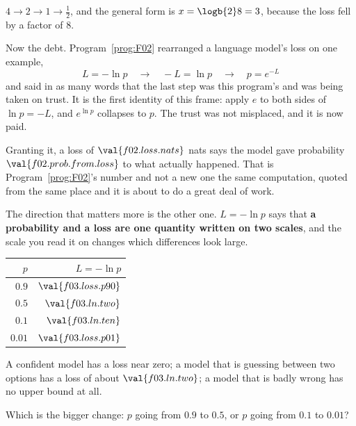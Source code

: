 \begin{fr}
$4 \to 2 \to 1 \to \tfrac{1}{2}$, and the general form is
$x = \logb{2} 8 = 3$, because the loss fell by a factor of $8$.

Now the debt. Program~\ref{prog:F02} rearranged a language model's loss on one
example,
\[ L = -\ln p \quad\longrightarrow\quad -L = \ln p
   \quad\longrightarrow\quad p = e^{-L} \]
and said in as many words that the last step was this program's and was being
taken on trust. It is the first identity of this frame: apply $e$ to both sides
of $\ln p = -L$, and $e^{\ln p}$ collapses to $p$. The trust was not misplaced,
and it is now paid.

Granting it, a loss of $\val{f02.loss.nats}$ nats says the model gave
probability $\val{f02.prob.from.loss}$ to what actually happened. That is
Program~\ref{prog:F02}'s number and not a new one \dash{} the same computation,
quoted from the same place \dash{} and it is about to do a great deal of work.
\end{fr}

\begin{fr}
The direction that matters more is the other one. $L = -\ln p$ says that
\textbf{a probability and a loss are one quantity written on two scales}, and
the scale you read it on changes which differences look large.

\begin{center}
\begin{tabular}{rr}
\toprule
$p$ & $L = -\ln p$ \\
\midrule
$\num{0.9}$ & $\val{f03.loss.p90}$ \\
$\num{0.5}$ & $\val{f03.ln.two}$ \\
$\num{0.1}$ & $\val{f03.ln.ten}$ \\
$\num{0.01}$ & $\val{f03.loss.p01}$ \\
\bottomrule
\end{tabular}
\end{center}

A confident model has a loss near zero; a model that is guessing between two
options has a loss of about $\val{f03.ln.two}$; a model that is badly wrong has
no upper bound at all.

Which is the bigger change: $p$ going from $\num{0.9}$ to $\num{0.5}$, or $p$
going from $\num{0.1}$ to $\num{0.01}$?
\nextframe
\end{fr}

